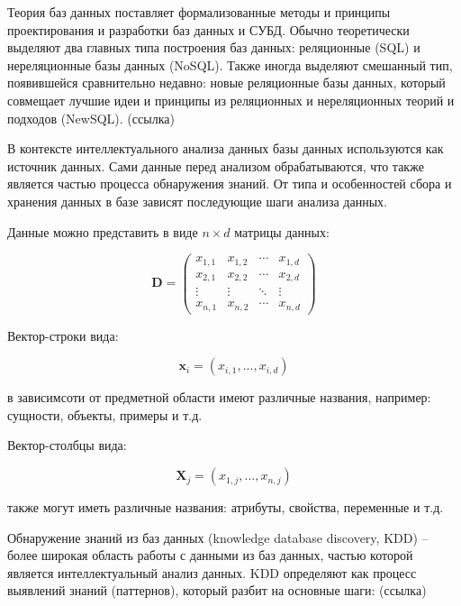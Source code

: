 Теория баз данных поставляет формализованные методы и принципы проектирования и разработки баз данных и СУБД.
Обычно теоретически выделяют два главных типа построения баз данных: реляционные (SQL) и нереляционные базы данных (NoSQL).
Также иногда выделяют смешанный тип, появившейся сравнительно недавно:
новые реляционные базы данных, который совмещает лучшие
идеи и принципы из реляционных и нереляционных теорий и подходов (NewSQL). (ссылка)

В контексте интеллектуального анализа данных базы данных используются как источник данных.
Сами данные перед анализом обрабатываются, что также является частью процесса обнаружения знаний.
От типа и особенностей сбора и хранения данных в базе зависят последующие шаги анализа данных.

Данные можно представить в виде $n\times d$ матрицы данных:

\begin{equation} \label{data_matrix}
    \textbf{D} = 
    \begin{pmatrix}
    x_{1,1} & x_{1,2} & \cdots & x_{1,d} \\
    x_{2,1} & x_{2,2} & \cdots & x_{2,d} \\
    \vdots  & \vdots  & \ddots & \vdots  \\
    x_{n,1} & x_{n,2} & \cdots & x_{n,d} 
    \end{pmatrix}
\end{equation}

Вектор-строки вида:

\begin{equation}
    \textbf{x}_i = (x_{i,1}, ..., x_{i,d})
\end{equation}

в зависимсоти от предметной области имеют различные названия, например:
сущности, объекты, примеры и т.д.

Вектор-столбцы вида:

\begin{equation}
    \textbf{X}_j = (x_{1,j}, ..., x_{n,j})
\end{equation}

также могут иметь различные названия: атрибуты, свойства, переменные и т.д.

Обнаружение знаний из баз данных (knowledge database discovery, KDD) --  более широкая область
работы с данными из баз данных, частью которой является интеллектуальный анализ данных.
KDD определяют как процесс выявлений знаний (паттернов), который разбит на основные шаги: (ссылка)


